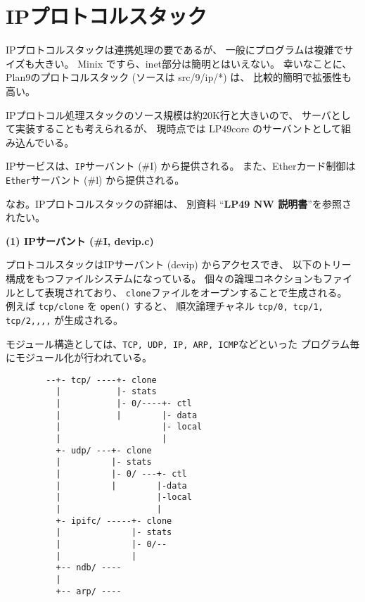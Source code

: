 {\vspace{5cm}




\section{IPプロトコルスタック} %

 IPプロトコルスタックは連携処理の要であるが、
一般にプログラムは複雑でサイズも大きい。
  Minix ですら、inet部分は簡明とはいえない。
 幸いなことに、Plan9のプロトコルスタック (ソースは src/9/ip/*) は、
 比較的簡明で拡張性も高い。

IPプロトコル処理スタックのソース規模は約20K行と大きいので、
サーバとして実装することも考えられるが、
現時点では LP49core のサーバントとして組み込んでいる。

IPサービスは、{\tt IP}サーバント (\#I) から提供される。
また、Etherカード制御は {\tt Ether}サーバント (\#l) から提供される。

なお。IPプロトコルスタックの詳細は、
別資料 ``{\bf LP49 NW 説明書}''を参照されたい。 

{\bf\flushleft  (1) IPサーバント (\#I, devip.c)}

 プロトコルスタックはIPサーバント (devip) からアクセスでき、
以下のトリー構成をもつファイルシステムになっている。
個々の論理コネクションもファイルとして表現されており、
 {\tt clone}ファイルをオープンすることで生成される。
 例えば {\tt tcp/clone} を {\tt open()} すると、
 順次論理チャネル {\tt tcp/0, tcp/1, tcp/2,,,,}  が生成される。

モジュール構造としては、{\tt TCP, UDP, IP, ARP, ICMP}などといった
プログラム毎にモジュール化が行われている。

{\footnotesize
\begin{verbatim}
        --+- tcp/ ----+- clone                        
          |           |- stats                
          |           |- 0/----+- ctl          
          |           |        |- data     
          |                    |- local    
          |                    |           
          +- udp/ ---+- clone                        
          |          |- stats                  
          |          |- 0/ ---+- ctl            
          |          |        |-data     
          |                   |-local    
          |                   |           
          +- ipifc/ -----+- clone                         
          |              |- stats                   
          |              |- 0/--                    
          |              |                          
          +-- ndb/ ----                                   
          |                                              
          +-- arp/ ----
\end{verbatim}
}

}
